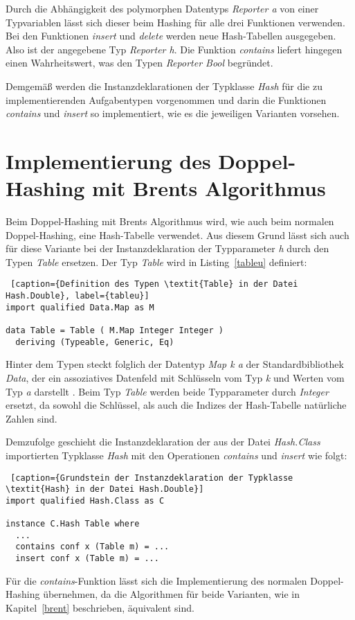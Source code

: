 Durch die Abhängigkeit des polymorphen Datentyps \textit{Reporter a} von einer Typvariablen lässt sich dieser beim Hashing für alle drei Funktionen verwenden. Bei den Funktionen \textit{insert} und \textit{delete} werden neue Hash-Tabellen ausgegeben. Also ist der angegebene Typ \textit{Reporter h}. Die Funktion \textit{contains} liefert hingegen einen Wahrheitswert, was den Typen \textit{Reporter Bool} begründet. 

Demgemäß werden die Instanzdeklarationen der Typklasse \textit{Hash} für die zu implementierenden Aufgabentypen vorgenommen und darin die Funktionen \textit{contains} und \textit{insert} so implementiert, wie es die jeweiligen Varianten vorsehen.

\section{Implementierung des Doppel-Hashing mit Brents Algorithmus}
Beim Doppel-Hashing mit Brents Algorithmus wird, wie auch beim normalen Doppel-Hashing, eine Hash-Tabelle verwendet. Aus diesem Grund lässt sich auch für diese Variante bei der Instanzdeklaration der Typparameter \textit{h} durch den Typen \textit{Table} ersetzen. 
\newpage
Der Typ \textit{Table} wird in Listing~\ref{tableu} definiert:
\begin{lstlisting} [caption={Definition des Typen \textit{Table} in der Datei Hash.Double}, label={tableu}]
import qualified Data.Map as M

data Table = Table ( M.Map Integer Integer ) 
  deriving (Typeable, Generic, Eq)
\end{lstlisting}
Hinter dem Typen steckt folglich der Datentyp \textit{Map k a} der Standardbibliothek \textit{Data}, der ein assoziatives Datenfeld mit Schlüsseln vom Typ \textit{k} und Werten vom Typ \textit{a} darstellt \cite{HasMap}. Beim Typ \textit{Table} werden beide Typparameter durch \textit{Integer} ersetzt, da sowohl die Schlüssel, als auch die Indizes der Hash-Tabelle natürliche Zahlen sind.

Demzufolge  geschieht die Instanzdeklaration der aus der Datei \textit{Hash.Class} importierten Typklasse \textit{Hash} mit den Operationen \textit{contains} und \textit{insert} wie folgt:
\begin{lstlisting} [caption={Grundstein der Instanzdeklaration der Typklasse \textit{Hash} in der Datei Hash.Double}]
import qualified Hash.Class as C

instance C.Hash Table where
  ...
  contains conf x (Table m) = ...
  insert conf x (Table m) = ...
\end{lstlisting}
Für die \textit{contains}-Funktion lässt sich die Implementierung des normalen Doppel-Hashing übernehmen, da die Algorithmen für beide Varianten, wie in Kapitel~\ref{brent} beschrieben, äquivalent sind. 

